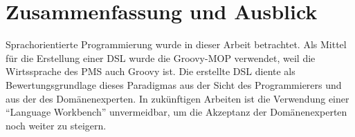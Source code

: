 \documentclass[11pt,english,ngerman, headsepline]{scrreprt}
\begin{document}
\chapter{Zusammenfassung und Ausblick}

Sprachorientierte Programmierung wurde in dieser Arbeit betrachtet. Als
Mittel für die Erstellung einer DSL wurde die Groovy-MOP verwendet, weil die
Wirtssprache des PMS auch Groovy ist. Die erstellte DSL
diente als Bewertungsgrundlage dieses Paradigmas aus der Sicht des
Programmierers und aus der des Domänenexperten. 
In zukünftigen Arbeiten ist die Verwendung einer ``Language Workbench''\cite{fowler2005language}
unvermeidbar, um die Akzeptanz der Domänenexperten noch weiter zu steigern.

 

\clearpage{}
\appendix
\renewcommand{\theequation}{A-\arabic{equation}}

\setcounter{equation}{0}  %




\end{document}
